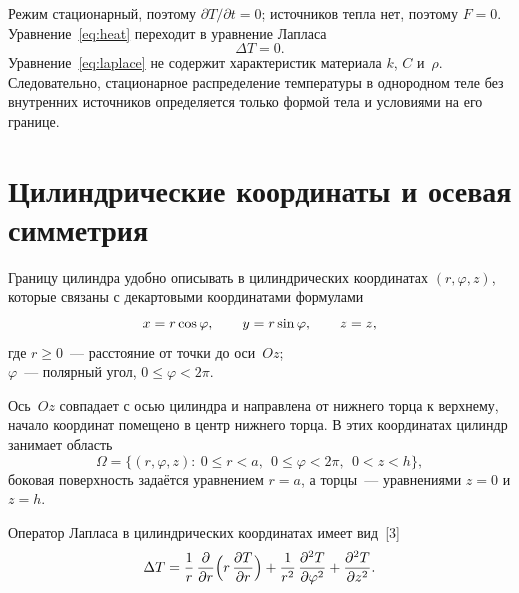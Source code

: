 Режим стационарный, поэтому $\partial T/\partial t=0$; источников тепла
нет, поэтому $F=0$. Уравнение~\eqref{eq:heat} переходит в уравнение Лапласа
\begin{equation}
\label{eq:laplace}
\Delta T=0 .
\end{equation}
Уравнение~\eqref{eq:laplace} не содержит характеристик материала $k$, $C$
и~$\rho$. Следовательно, стационарное распределение температуры
в однородном теле без внутренних источников определяется только формой тела
и условиями на его границе.

\section{Цилиндрические координаты и осевая симметрия}
\label{sec:cyl}

Границу цилиндра удобно описывать в цилиндрических координатах
$(r,\varphi,z)$, которые связаны с декартовыми координатами формулами
\begin{equation}
\label{eq:cyl}
x=r\cos\varphi,\qquad y=r\sin\varphi,\qquad z=z,
\postdisplaypenalty=10000
\end{equation}
где $r\ge 0$~— расстояние от точки до оси~$Oz$;\\
\hphantom{где }$\varphi$~— полярный угол, $0\le\varphi<2\pi$.

Ось~$Oz$ совпадает с осью цилиндра и направлена от нижнего торца
к верхнему, начало координат помещено в центр нижнего торца. В этих
координатах цилиндр занимает область
\begin{equation}
\label{eq:Omega}
\Omega=\bigl\{(r,\varphi,z):\ 0\le r<a,\ \ 0\le\varphi<2\pi,\ \ 0<z<h\bigr\},
\end{equation}
боковая поверхность задаётся уравнением $r=a$, а торцы~— уравнениями
$z=0$ и $z=h$.

Оператор Лапласа в цилиндрических координатах имеет вид~[3]
\begin{equation}
\label{eq:lap-cyl}
\Delta T=\frac{1}{r}\,\dfrac{\partial }{\partial r}\Bigl(r\,\dfrac{\partial T}{\partial r}\Bigr)
+\frac{1}{r^2}\,\dfrac{\partial^2 T}{\partial \varphi^2}+\dfrac{\partial^2 T}{\partial z^2} .
\end{equation}

